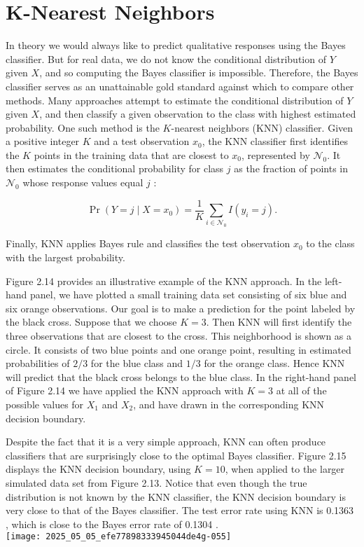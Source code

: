 \documentclass[10pt]{article}
\begin{document}
\section*{K-Nearest Neighbors}
In theory we would always like to predict qualitative responses using the Bayes classifier. But for real data, we do not know the conditional distribution of $Y$ given $X$, and so computing the Bayes classifier is impossible. Therefore, the Bayes classifier serves as an unattainable gold standard against which to compare other methods. Many approaches attempt to estimate the conditional distribution of $Y$ given $X$, and then classify a given observation to the class with highest estimated probability. One such method is the $K$-nearest neighbors (KNN) classifier. Given a positive integer $K$ and a test observation $x_{0}$, the KNN classifier first identifies the $K$ points in the training data that are closest to $x_{0}$, represented by $\mathcal{N}_{0}$. It then estimates the conditional probability for class $j$ as the fraction of points in $\mathcal{N}_{0}$ whose response values equal $j$ :


\begin{equation*}
\operatorname{Pr}\left(Y=j \mid X=x_{0}\right)=\frac{1}{K} \sum_{i \in \mathcal{N}_{0}} I\left(y_{i}=j\right) . \tag{2.12}
\end{equation*}


Finally, KNN applies Bayes rule and classifies the test observation $x_{0}$ to the class with the largest probability.

Figure 2.14 provides an illustrative example of the KNN approach. In the left-hand panel, we have plotted a small training data set consisting of six blue and six orange observations. Our goal is to make a prediction for the point labeled by the black cross. Suppose that we choose $K=3$. Then KNN will first identify the three observations that are closest to the cross. This neighborhood is shown as a circle. It consists of two blue points and one orange point, resulting in estimated probabilities of $2 / 3$ for the blue class and $1 / 3$ for the orange class. Hence KNN will predict that the black cross belongs to the blue class. In the right-hand panel of Figure 2.14 we have applied the KNN approach with $K=3$ at all of the possible values for $X_{1}$ and $X_{2}$, and have drawn in the corresponding KNN decision boundary.

Despite the fact that it is a very simple approach, KNN can often produce classifiers that are surprisingly close to the optimal Bayes classifier. Figure 2.15 displays the KNN decision boundary, using $K=10$, when applied to the larger simulated data set from Figure 2.13. Notice that even though the true distribution is not known by the KNN classifier, the KNN decision boundary is very close to that of the Bayes classifier. The test error rate using KNN is 0.1363 , which is close to the Bayes error rate of 0.1304 
.\\
\texttt{[image: 2025\_05\_05\_efe77898333945044de4g-055]}
\end{document}
